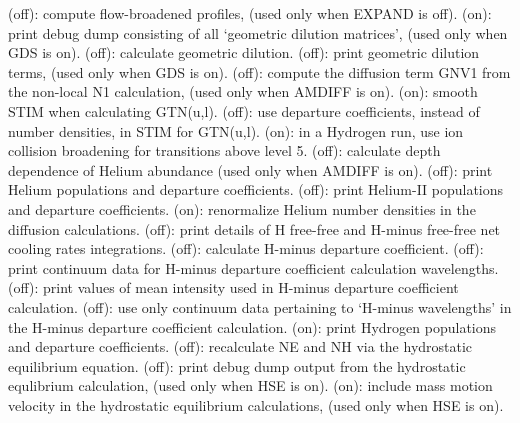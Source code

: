 \space \vbox { (off): \bang
compute flow-broadened profiles, (used only when EXPAND is off).}
\space \vbox { (on): \bang
print debug dump consisting of all `geometric dilution matrices', (used
only when GDS is on).}
\space \vbox { (off): \bang
calculate geometric dilution.}
\space \vbox { (off): \bang
print geometric dilution terms, (used only when GDS is on).}
\space \vbox { (off): \bang
compute the diffusion term GNV1 from the non-local N1 calculation, (used
only when AMDIFF is on).}
\space \vbox { (on): \bang
smooth STIM when calculating GTN(u,l).}
\space \vbox { (off): \bang
use departure coefficients, instead of number densities, in STIM
for GTN(u,l).}
\space \vbox { (on): \bang
in a Hydrogen run, use ion collision broadening for transitions
above level 5.}
\space \vbox { (off): \bang 
calculate depth dependence of Helium abundance (used only when
AMDIFF is on).}
\space \vbox { (off): \bang
print Helium populations and departure coefficients.}
\space \vbox { (off): \bang
print Helium-II populations and departure coefficients.}
\space \vbox { (on): \bang
renormalize Helium number densities in the diffusion calculations.}
\space \vbox { (off): \bang
print details of H free-free and H-minus free-free net cooling rates
integrations.}
\space \vbox { (off): \bang
calculate H-minus departure coefficient.}
\space \vbox { (off): \bang
print continuum data for H-minus departure coefficient calculation
wavelengths.}
\space \vbox { (off): \bang
print values of mean intensity used in H-minus departure coefficient
calculation.}
\space \vbox { (off): \bang
use only continuum data pertaining to `H-minus wavelengths' in the
H-minus departure coefficient calculation.}
\space \vbox { (on): \bang
print Hydrogen populations and departure coefficients.}
\space \vbox { (off): \bang
recalculate NE and NH via the hydrostatic equilibrium equation.}
\space \vbox { (off): \bang
print debug dump output from the hydrostatic equlibrium calculation,
(used only when HSE is on).}
\space \vbox { (on): \bang
include mass motion velocity in the hydrostatic equilibrium calculations, 
(used only when HSE is on).}
